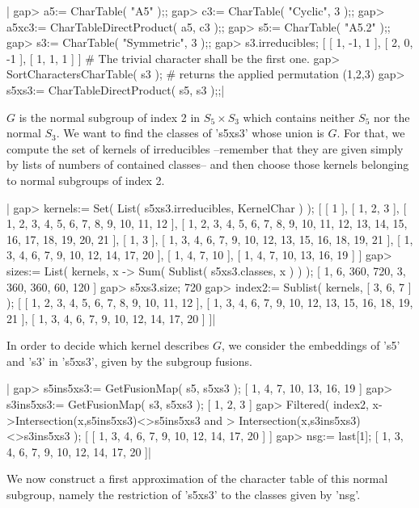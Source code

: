 |    gap> a5:= CharTable( "A5" );;
    gap> c3:= CharTable( "Cyclic", 3 );;
    gap> a5xc3:= CharTableDirectProduct( a5, c3 );;
    gap> s5:= CharTable( "A5.2" );;
    gap> s3:= CharTable( "Symmetric", 3 );;
    gap> s3.irreducibles;
    [ [ 1, -1, 1 ], [ 2, 0, -1 ], [ 1, 1, 1 ] ]
    # The trivial character shall be the first one.
    gap> SortCharactersCharTable( s3 );  # returns the applied permutation
    (1,2,3)
    gap> s5xs3:= CharTableDirectProduct( s5, s3 );;|

$G$ is the normal subgroup of index  2 in $S_5\times  S_3$ which contains
neither  $S_5$ nor  the  normal  $S_3$.  We want to  find the  classes of
's5xs3' whose union  is $G$.  For that, we compute the  set of kernels of
irreducibles --remember that they are given simply by lists of numbers of
contained  classes-- and  then  choose those  kernels belonging to normal
subgroups of index 2.

|    gap> kernels:= Set( List( s5xs3.irreducibles, KernelChar ) );
    [ [ 1 ], [ 1, 2, 3 ], [ 1, 2, 3, 4, 5, 6, 7, 8, 9, 10, 11, 12 ],
      [ 1, 2, 3, 4, 5, 6, 7, 8, 9, 10, 11, 12, 13, 14, 15, 16, 17, 18,
          19, 20, 21 ], [ 1, 3 ],
      [ 1, 3, 4, 6, 7, 9, 10, 12, 13, 15, 16, 18, 19, 21 ],
      [ 1, 3, 4, 6, 7, 9, 10, 12, 14, 17, 20 ], [ 1, 4, 7, 10 ],
      [ 1, 4, 7, 10, 13, 16, 19 ] ]
    gap> sizes:= List( kernels, x -> Sum( Sublist( s5xs3.classes, x ) ) );
    [ 1, 6, 360, 720, 3, 360, 360, 60, 120 ]
    gap> s5xs3.size;
    720
    gap> index2:= Sublist( kernels, [ 3, 6, 7 ] );
    [ [ 1, 2, 3, 4, 5, 6, 7, 8, 9, 10, 11, 12 ],
      [ 1, 3, 4, 6, 7, 9, 10, 12, 13, 15, 16, 18, 19, 21 ],
      [ 1, 3, 4, 6, 7, 9, 10, 12, 14, 17, 20 ] ]|

In order to decide which kernel describes $G$, we consider the embeddings
of 's5' and 's3' in 's5xs3', given by the subgroup fusions.

|    gap> s5ins5xs3:= GetFusionMap( s5, s5xs3 );
    [ 1, 4, 7, 10, 13, 16, 19 ]
    gap> s3ins5xs3:= GetFusionMap( s3, s5xs3 );
    [ 1, 2, 3 ]
    gap> Filtered( index2, x->Intersection(x,s5ins5xs3)<>s5ins5xs3 and
    >                         Intersection(x,s3ins5xs3)<>s3ins5xs3     );
    [ [ 1, 3, 4, 6, 7, 9, 10, 12, 14, 17, 20 ] ]
    gap> nsg:= last[1];
    [ 1, 3, 4, 6, 7, 9, 10, 12, 14, 17, 20 ]|

We now construct  a first  approximation of  the character  table of this
normal  subgroup, namely the  restriction of 's5xs3' to the classes given
by 'nsg'.

